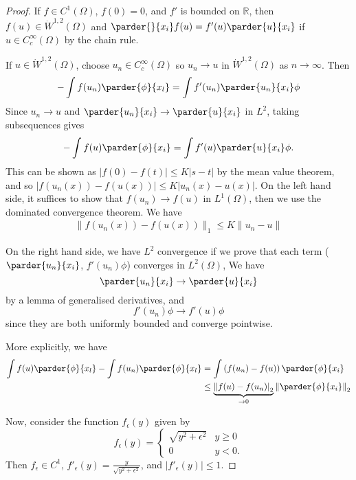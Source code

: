 \documentclass[10pt, oneside, reqno]{amsart}
\theoremstyle{plain}%
\numberwithin{equation}{section}
\theoremstyle{definition}
\theoremstyle{remark}
\newcommand{\R}{\mathbb{R}}
\begin{document}
\begin{proof}
    If $f \in C^1(\Omega)$, $f(0) = 0$, and $f'$ is bounded on $\R$, then $f(u) \in \dot W^{1,2}(\Omega)$ and $\parder{}{x_i} f(u) = f'(u) \parder{u}{x_i}$ if $u \in C^\infty_c(\Omega)$ by the chain rule.  
    
    If $u \in \dot W^{1, 2}(\Omega)$, choose $u_n \in C^\infty_c(\Omega)$ so $u_n \rightarrow u$ in $\dot W^{1, 2}(\Omega)$ as $n \rightarrow \infty$.  Then \begin{align*}
        -\int f(u_n) \parder{\phi}{x_l} = \int f'(u_n) \parder{u_n}{x_i} \phi
    \end{align*}
    Since $u_n \rightarrow u$ and $\parder{u_n}{x_i} \rightarrow \parder{u}{x_i}$ in $L^2$, taking subsequences gives \[
        - \int f(u) \parder{\phi}{x_i} = \int f'(u) \parder{u}{x_i} \phi \qedhere.
    \]  This can be shown as $|f(0) - f(t)| \leq K |s-t|$ by the mean value theorem, and so $|f(u_n(x)) - f(u(x))| \leq K | u_n(x) - u(x) |$.  On the left hand side, it suffices to show that $f(u_n) \rightarrow f(u)$ in $L^1(\Omega)$, then we use the dominated convergence theorem.  We have \begin{align*}
        \|f(u_n(x)) - f(u(x)) \|_1 \leq K \| u_n - u \|
    \end{align*}

On the right hand side, we have $L^2$ convergence if we prove that each term ($\parder{u_n}{x_i}$, $f'(u_n) \phi$) converges in $L^2(\Omega)$,  We have \[
    \parder{u_n}{x_i} \rightarrow \parder{u}{x_i}
\] by a lemma of generalised derivatives, and \[
    f'(u_n) \phi \rightarrow f'(u) \phi
\] since they are both uniformly bounded and converge pointwise.
    
    More explicitly, we have \begin{align*}
        \int f(u) \parder{\phi}{x_l} - \int f(u_n) \parder{\phi}{x_l} &= \int \left(f(u_n) - f(u) \right) \parder{\phi}{x_i} \\
        &\leq \underbrace{\left\| f(u) - f(u_n) \right|_2}_{\rightarrow 0} \left\| \parder{\phi}{x_i} \right\|_2
    \end{align*}

    Now, consider the function $f_\epsilon(y)$ given by \[
        f_\epsilon(y) = \begin{cases}
            \sqrt{y^2 + \epsilon^2} & y \geq 0 \\
            0 & y < 0.
        \end{cases}
    \]  Then $f_\epsilon \in C^1$, $f'_\epsilon (y) = \frac{y}{\sqrt{y^2 + \epsilon^2}}$, and $|f'_\epsilon (y)| \leq 1$.  
    

\end{proof}
\end{document}
